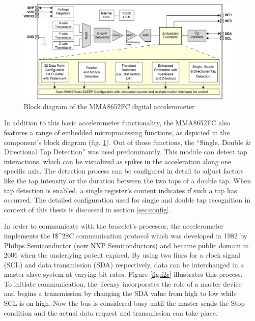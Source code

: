 \begin{figure}[bth]
	\myfloatalign
	\includegraphics[width=\linewidth]{gfx/accel.pdf}
	\caption[Block diagram of the MMA8652FC digital accelerometer]{Block diagram of the MMA8652FC digital accelerometer \cite{datasheet:mma8652}} \label{fig:accel}
\end{figure}

In addition to this basic accelerometer functionality, the MMA8652FC also features a range of embedded microprocessing functions, as depicted in the component's block diagram (fig. \ref{fig:accel}). Out of those functions, the ``Single, Double \& Directional Tap Detection'' was used predominantly. This module can detect tap interactions, which can be visualized as spikes in the acceleration along one specific axis. The detection process can be configured in detail to adjust factors like the tap intensity or the duration between the two taps of a double tap. When tap detection is enabled, a single register's content indicates if such a tap has occurred. The detailed configuration used for single and double tap recognition in context of this thesis is discussed in section \ref{sec:config}.

In order to communicate with the bracelet's processor, the accelerometer implements the \ac{I$^2$C} communication protocol which was developed in 1982 by Philips Semiconductor (now NXP Semiconductors) and became public domain in 2006 when the underlying patent expired. By using two lines for a clock signal (\textsc{SCL}) and data transmission (\textsc{SDA}) respectively, data can be interchanged in a master-slave system at varying bit rates. Figure \ref{fig:i2c} illustrates this process. To initiate communication, the Teensy incorporates the role of a master device and begins a transmission by changing the \textsc{SDA} value from high to low while \textsc{SCL} is on high. Now the bus is considered busy until the master sends the Stop condition and the actual data request and transmission can take place.

